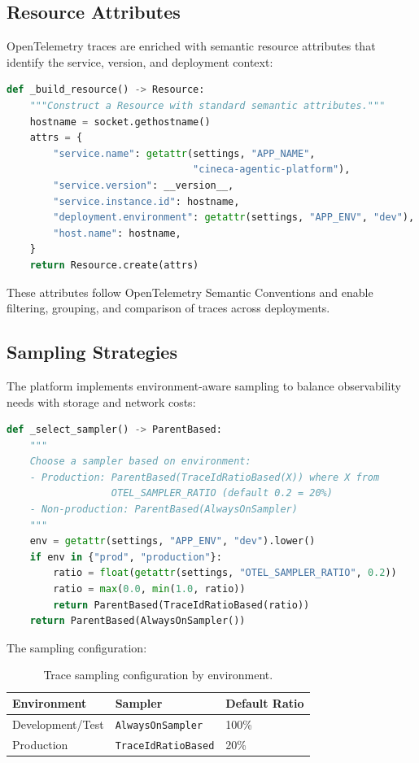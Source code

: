 \subsection{Resource Attributes}

OpenTelemetry traces are enriched with semantic resource attributes that identify the service, version, and deployment context:

\begin{lstlisting}[language=Python, caption={OpenTelemetry resource attribute configuration}]
def _build_resource() -> Resource:
    """Construct a Resource with standard semantic attributes."""
    hostname = socket.gethostname()
    attrs = {
        "service.name": getattr(settings, "APP_NAME", 
                                "cineca-agentic-platform"),
        "service.version": __version__,
        "service.instance.id": hostname,
        "deployment.environment": getattr(settings, "APP_ENV", "dev"),
        "host.name": hostname,
    }
    return Resource.create(attrs)
\end{lstlisting}

These attributes follow OpenTelemetry Semantic Conventions and enable filtering, grouping, and comparison of traces across deployments.

\subsection{Sampling Strategies}

The platform implements environment-aware sampling to balance observability needs with storage and network costs:

\begin{lstlisting}[language=Python, caption={Environment-aware trace sampling}]
def _select_sampler() -> ParentBased:
    """
    Choose a sampler based on environment:
    - Production: ParentBased(TraceIdRatioBased(X)) where X from 
                  OTEL_SAMPLER_RATIO (default 0.2 = 20%)
    - Non-production: ParentBased(AlwaysOnSampler)
    """
    env = getattr(settings, "APP_ENV", "dev").lower()
    if env in {"prod", "production"}:
        ratio = float(getattr(settings, "OTEL_SAMPLER_RATIO", 0.2))
        ratio = max(0.0, min(1.0, ratio))
        return ParentBased(TraceIdRatioBased(ratio))
    return ParentBased(AlwaysOnSampler())
\end{lstlisting}

The sampling configuration:

\begin{table}[ht]
\centering
\caption{Trace sampling configuration by environment.}
\label{tab:trace-sampling}
\begin{tabular}{lll}
\hline
\textbf{Environment} & \textbf{Sampler} & \textbf{Default Ratio} \\
\hline
Development/Test & \texttt{AlwaysOnSampler} & 100\% \\
Production & \texttt{TraceIdRatioBased} & 20\% \\
\hline
\end{tabular}
\end{table}


